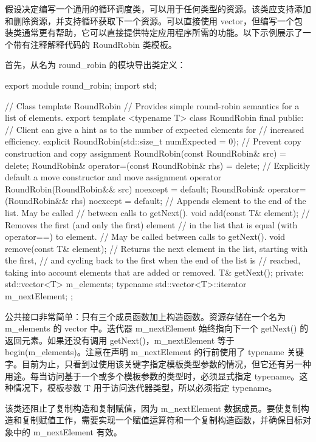 假设决定编写一个通用的循环调度类，可以用于任何类型的资源。该类应支持添加和删除资源，并支持循环获取下一个资源。可以直接使用 vector，但编写一个包装类通常更有帮助，它可以直接提供特定应用程序所需的功能。以下示例展示了一个带有注释解释代码的 RoundRobin 类模板。

首先，从名为 round\_robin 的模块导出类定义：

\begin{cpp}
export module round_robin;
import std;

// Class template RoundRobin
// Provides simple round-robin semantics for a list of elements.
export template <typename T>
class RoundRobin final
{
    public:
        // Client can give a hint as to the number of expected elements for
        // increased efficiency.
        explicit RoundRobin(std::size_t numExpected = 0);
        // Prevent copy construction and copy assignment
        RoundRobin(const RoundRobin& src) = delete;
        RoundRobin& operator=(const RoundRobin& rhs) = delete;
        // Explicitly default a move constructor and move assignment operator
        RoundRobin(RoundRobin&& src) noexcept = default;
        RoundRobin& operator=(RoundRobin&& rhs) noexcept = default;
        // Appends element to the end of the list. May be called
        // between calls to getNext().
        void add(const T& element);
        // Removes the first (and only the first) element
        // in the list that is equal (with operator==) to element.
        // May be called between calls to getNext().
        void remove(const T& element);
        // Returns the next element in the list, starting with the first,
        // and cycling back to the first when the end of the list is
        // reached, taking into account elements that are added or removed.
        T& getNext();
    private:
        std::vector<T> m_elements;
        typename std::vector<T>::iterator m_nextElement;
};
\end{cpp}

公共接口非常简单：只有三个成员函数加上构造函数。资源存储在一个名为 m\_elements 的 vector 中。迭代器 m\_nextElement 始终指向下一个 getNext() 的返回元素。如果还没有调用 getNext()，m\_nextElement 等于 begin(m\_elements)。注意在声明 m\_nextElement 的行前使用了 typename 关键字。目前为止，只看到过使用该关键字指定模板类型参数的情况，但它还有另一种用途。每当访问基于一个或多个模板参数的类型时，必须显式指定 typename。这种情况下，模板参数 T 用于访问迭代器类型，所以必须指定 typename。

该类还阻止了复制构造和复制赋值，因为 m\_nextElement 数据成员。要使复制构造和复制赋值工作，需要实现一个赋值运算符和一个复制构造函数，并确保目标对象中的 m\_nextElement 有效。

